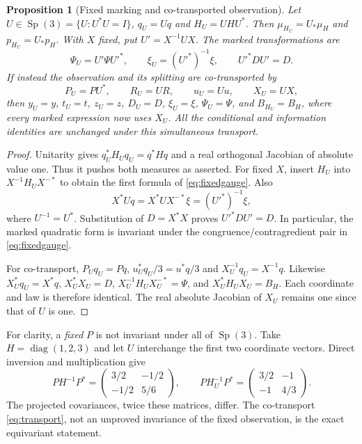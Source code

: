 \documentclass[11pt,a4paper]{article}
\numberwithin{equation}{section}
\newtheorem{proposition}[theorem]{Proposition}
\theoremstyle{definition}
\theoremstyle{remark}
\newcommand{\Sp}{\operatorname{Sp}}
\newcommand{\diag}{\operatorname{diag}}
\newcommand{\invstar}{^{-\!*}}
\begin{document}
\begin{proposition}[Fixed marking and co-transported observation]\label{prop:gauge}
Let $U\in\Sp(3)=\{U:U^*U=I\}$, $q_U=Uq$ and $H_U=UHU^*$.
Then $\mu_{H_U}=U_*\mu_H$ and $p_{H_U}=U_*p_H$.
With $X$ fixed, put $U'=X^{-1}UX$. The marked transformations are
\begin{equation}\label{eq:fixedgauge}
\Psi_U=U'\Psi U'^*,\qquad
\xi_U=(U'^*)^{-1}\xi,\qquad U'^*DU'=D.
\end{equation}
If instead the observation and its splitting are co-transported by
\begin{equation}\label{eq:transport}
P_U=PU^*,\qquad R_U=UR,\qquad u_U=Uu,\qquad X_U=UX,
\end{equation}
then $y_U=y$, $t_U=t$, $z_U=z$, $D_U=D$, $\xi_U=\xi$,
$\Psi_U=\Psi$, and $B_{H_U}=B_H$, where every marked expression now
uses $X_U$. All the conditional and information identities are
unchanged under this simultaneous transport.
\end{proposition}
\begin{proof}
Unitarity gives $q_U^*H_Uq_U=q^*Hq$ and a real orthogonal Jacobian of
absolute value one. Thus it pushes both measures as asserted.
For fixed $X$, insert $H_U$ into $X^{-1}H_UX\invstar$ to obtain the
first formula of \eqref{eq:fixedgauge}. Also
\[
X^*Uq=X^*UX\invstar\xi=(U'^*)^{-1}\xi,
\]
where $U^{-1}=U^*$. Substitution of $D=X^*X$ proves
$U'^*DU'=D$. In particular, the marked quadratic form is invariant
under the congruence/contragredient pair in \eqref{eq:fixedgauge}.

For co-transport, $P_Uq_U=Pq$, $u_U^*q_U/3=u^*q/3$ and
$X_U^{-1}q_U=X^{-1}q$. Likewise
$X_U^*q_U=X^*q$, $X_U^*X_U=D$,
$X_U^{-1}H_UX_U\invstar=\Psi$, and
$X_U^*H_UX_U=B_H$. Each coordinate and law is therefore identical.
The real absolute Jacobian of $X_U$ remains one since that of $U$ is one.
\end{proof}

For clarity, a \emph{fixed} $P$ is not invariant under all of $\Sp(3)$.
Take $H=\diag(1,2,3)$ and let $U$ interchange the first two coordinate
vectors. Direct inversion and multiplication give
\begin{equation}\label{eq:fixedcounterexample}
PH^{-1}P^*=\begin{pmatrix}3/2&-1/2\\-1/2&5/6\end{pmatrix},\qquad
PH_U^{-1}P^*=\begin{pmatrix}3/2&-1\\-1&4/3\end{pmatrix}.
\end{equation}
The projected covariances, twice these matrices, differ. The
co-transport \eqref{eq:transport}, not an unproved invariance of the
fixed observation, is the exact equivariant statement.
\end{document}
